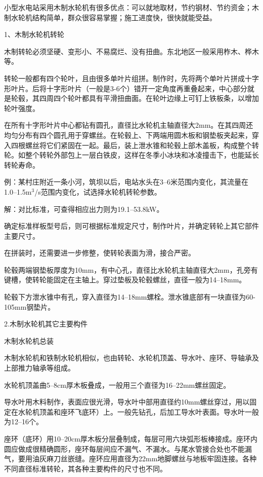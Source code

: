 \documentclass{ctexbook}
\begin{document}
小型水电站采用木制水轮机有很多优点：可以就地取材，节约钢材、节约资金；木制水轮机结构简单，群众很容易掌握；施工进度快，很快就能受益。

1、木制水轮机转轮

木制转轮必须坚硬、变形小、不易腐烂、没有扭曲。东北地区一般采用柞木、桦木等。

转轮一般都有四个轮叶，且由很多单叶片组拼。制作时，先将两个单叶片拼成十字形叶片。后将十字形叶片（一般是3-6个）错开一定角度再重叠起来，中心部分就是轮毂，其四周四个轮叶都具有平滑扭曲面。在轮叶边缘上可钉上铁板条，以增加轮叶强度。

在所有十字形叶片中心都钻有圆孔，直径比水轮机主轴直径大2mm。在其四周还均匀分布有四个圆孔用于穿螺丝。在轮毂上、下两端用圆木板和钢垫板夹起来，穿入四根螺丝将它们紧固在一起。最后，装上泄水锥和轮毂上部木盖板，构成整个转轮。如整个转轮外部包上一层白铁皮，这样在冬季小冰块和冰凌撞击下，也能延长转轮寿命。

例：某村庄附近一条小河，筑坝以后，电站水头在3--6米范围内变化，其流量在1.0--1.5m$^3$/s范围内变化，试选择水轮机转轮参数。

解：对比标准，可查得相应出力则为19.1--53.8kW。

确定标准样板型号后，则可根据标准规定尺寸，制作叶片，并确定转轮上其它部件主要尺寸。

在拼装时，还需要进一步修整，使转轮表面为滑，接合严密。

轮毂两端钢垫板厚度为10mm，有中心孔，直径比水轮机主轴直径大2mm，孔旁有键槽，使转轮能固定在主轴上。穿过垫板及轮毂螺丝，直径一般为14--18mm。

轮毂下方泄水锥中有孔，穿入直径为14--18mm螺栓。泄水锥底部有一块直径为60-105mm钢垫片。

2.木制水轮机其它主要构件

木制水轮机总装

木制水轮机和铁制水轮机相似，也由转轮、水轮机顶盖、导水叶、座环、导轴承及上部推力轴承等组成。

水轮机顶盖曲5--8cm厚木板叠成，一般用三个直径为16--22mm螺丝固定。

导水叶用木料制作，表面应很光滑，导水叶中部用直径约10mm螺丝穿过，用以固定在水轮机顶盖和座环飞底环）上。一般先钻孔，后加工导水叶表面。导水叶一般为12--16个。

座环（底环）用10--20cm厚木板分层叠制成，每层可用六块弧形板棒接成。座环内圆应做成很精确圆形，座环每层间应不漏气、不漏水。与尾水管接合处也不能漏气，要用油灰麻刀丝嵌缝。座环应用直径为22mm地脚螺丝与地板牢固连接。各种不同直径标准转轮，其各种主要构件的尺寸也不同。
\end{document}
